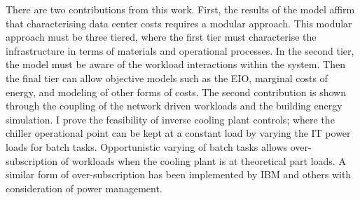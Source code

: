 There are two contributions from this work. First, the results of the model affirm that characterising data center costs requires a modular approach. This modular approach must be three tiered, where the first tier must characterise the infrastructure in terms of materials and operational processes. In the second tier, the model must be aware of the workload interactions within the system. Then the final tier can allow objective models such as the EIO, marginal costs of energy, and modeling of other forms of costs. The second contribution is shown through the coupling of the network driven workloads and the building energy simulation. I prove the feasibility of inverse cooling plant controls; where the chiller operational point can be kept at a constant load by varying the IT power loads for batch tasks. Opportunistic varying of batch tasks allows over-subscription of workloads when the cooling plant is at theoretical part loads. A similar form of over-subscription has been implemented by IBM and others with consideration of power management.


 
